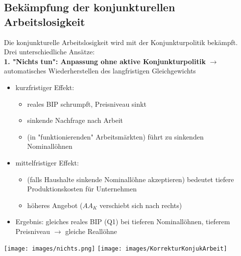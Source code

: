 \subsection{Bekämpfung der konjunkturellen Arbeitslosigkeit}
Die konjunkturelle Arbeitslosigkeit wird mit der Konjunkturpolitik bekämpft. Drei unterschiedliche Ansätze:\\
\textbf{1. "Nichts tun": Anpassung ohne aktive Konjunkturpolitik} $\rightarrow$ automatisches Wiederherstellen des langfristigen Gleichgewichts\\
\begin{itemize}
	\item kurzfristiger Effekt:
	\begin{itemize}
		\item reales BIP schrumpft, Preisniveau sinkt
		\item sinkende Nachfrage nach Arbeit
		\item (in "funktionierenden" Arbeitsmärkten) führt zu sinkenden Nominallöhnen
	\end{itemize}
	\item mittelfristiger Effekt:
	\begin{itemize}
		\item (falls Haushalte sinkende Nominallöhne akzeptieren) bedeutet tiefere Produktionskosten für Unternehmen
		\item höheres Angebot ($AA_K$ verschiebt sich nach rechts)
	\end{itemize}
	\item Ergebnis: gleiches reales BIP (Q1) bei tieferen Nominallöhnen, tieferem Preisniveau $\rightarrow$ gleiche Reallöhne
\end{itemize}
\texttt{[image: images/nichts.png]}%
\texttt{[image: images/KorrekturKonjukArbeit]}


